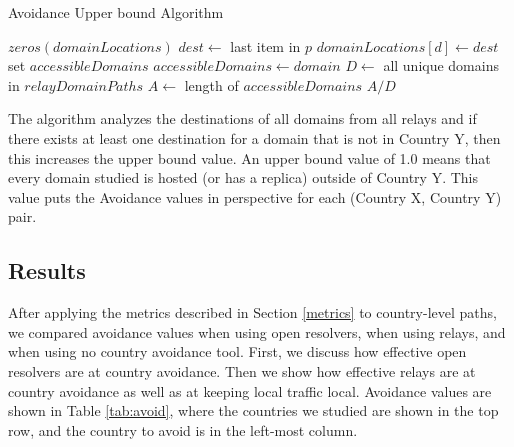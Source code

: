 \begin{algorithm}[t]
\caption{Avoidance Upper bound Algorithm}
\label{upperbound_algo}
\begin{algorithmic}[1]
    \State $zeros(domainLocations)$
		\State $dest \gets $ last item in $p$
		\State $domainLocations[d] \gets dest$
    \EndFor
    \State set $accessibleDomains$
    \State $accessibleDomains \gets domain$
    \EndIf
    \EndFor
    \State $D \gets$ all unique domains in  $relayDomainPaths$
    \State $A \gets$ length of $accessibleDomains$
    \State \Return $A / D$
\EndFunction
\end{algorithmic}
\end{algorithm}

The algorithm analyzes the destinations of all domains from all relays and if there exists at least one destination for a domain that is not in Country Y, then this increases the upper bound value.  An upper bound value of 1.0 means that every domain studied is hosted (or has a replica) outside of Country Y.  This value puts the Avoidance values in perspective for each (Country X, Country Y) pair. 

\subsection{Results}
After applying the metrics described in Section \ref{metrics} to country-level paths, we compared avoidance values when using open resolvers, when using relays, and when using no country avoidance tool.  First, we discuss how effective open resolvers are at country avoidance.  Then we show how effective relays are at country avoidance as well as at keeping local traffic local.  Avoidance values are shown in Table \ref{tab:avoid}, where the countries we studied are shown in the top row, and the country to avoid is in the left-most column.  

